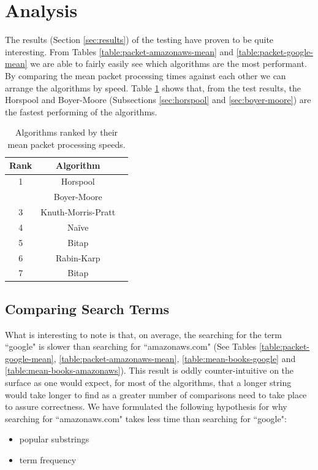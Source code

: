 \documentclass{article}
\begin{document}
\section{Analysis}

The results (Section \ref{sec:results}) of the testing have proven to be quite interesting. From Tables \ref{table:packet-amazonaws-mean} and \ref{table:packet-google-mean} we are able to fairly easily see which algorithms are the most performant. By comparing the mean packet processing times against each other we can arrange the algorithms by speed. Table \ref{table:ranked-mean-packet-processing-time} shows that, from the test results, the Horspool and Boyer-Moore (Subsections \ref{sec:horspool} and \ref{sec:boyer-moore}) are the fastest performing of the algorithms.

\begin{table}[h!bt]
  \centering
  \begin{tabular}{c|cc}
    Rank & Algorithm\\
    \hline
    1 & Horspool \\
      & Boyer-Moore \\
    3 & Knuth-Morris-Pratt \\
    4 & Na{\"i}ve \\
    5 & Bitap \\
    6 & Rabin-Karp \\
    7 & Bitap 
  \end{tabular}
  \caption{Algorithms ranked by their mean packet processing speeds.}
  \label{table:ranked-mean-packet-processing-time}
\end{table}

\subsection{Comparing Search Terms}

What is interesting to note is that, on average, the searching for the term ``google" is slower than searching for ``amazonaws.com" (See Tables \ref{table:packet-google-mean}, \ref{table:packet-amazonaws-mean}, \ref{table:mean-books-google} and \ref{table:mean-books-amazonaws}). This result is oddly counter-intuitive on the surface as one would expect, for most of the algorithms, that a longer string would take longer to find as a greater number of comparisons need to take place to assure correctness. We have formulated the following hypothesis for why searching for ``amazonaws.com" takes less time than searching for ``google":
\begin{itemize}
  \item popular substrings
  \item term frequency
\end{itemize}
\end{document}
